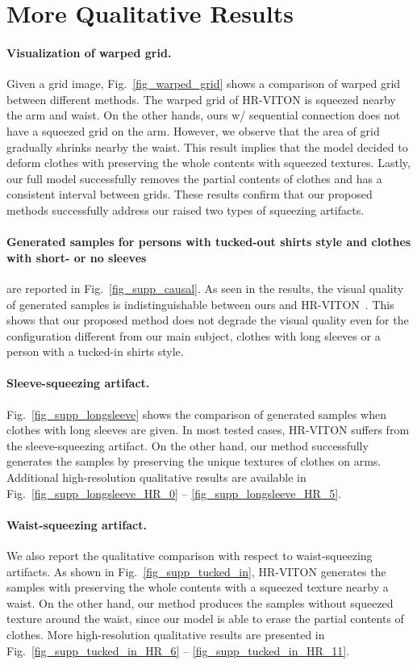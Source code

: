 \section{More Qualitative Results}


\paragraph{Visualization of warped grid.} 
Given a grid image, Fig.~\ref{fig_warped_grid} shows a comparison of warped grid between different methods.
The warped grid of HR-VITON is squeezed nearby the arm and waist.
On the other hands, ours w/ sequential connection does not have a squeezed grid on the arm.
However, we observe that the area of grid gradually shrinks nearby the waist.
This result implies that the model decided to deform clothes with preserving the whole contents with squeezed textures.
Lastly, our full model successfully removes the partial contents of clothes and has a consistent interval between grids.
These results confirm that our proposed methods successfully address our raised two types of squeezing artifacts.

\paragraph{Generated samples for persons with tucked-out shirts style and clothes with short- or no sleeves} are reported in Fig.~\ref{fig_supp_causal}.
As seen in the results, the visual quality of generated samples is indistinguishable between ours and HR-VITON~\cite{lee2022hrviton}.
This shows that our proposed method does not degrade the visual quality
even for the configuration different from our main subject, 
clothes with long sleeves or a person with a tucked-in shirts style.

\paragraph{Sleeve-squeezing artifact.}
Fig.~\ref{fig_supp_longsleeve} shows the comparison of generated samples when clothes with long sleeves are given.
In most tested cases, HR-VITON suffers from the sleeve-squeezing artifact.
On the other hand, our method successfully generates the samples by preserving the unique textures of clothes on arms.
Additional high-resolution qualitative results are available in Fig.~\ref{fig_supp_longsleeve_HR_0} -- \ref{fig_supp_longsleeve_HR_5}.


\paragraph{Waist-squeezing artifact.}
We also report the qualitative comparison with respect to waist-squeezing artifacts.
As shown in Fig.~\ref{fig_supp_tucked_in}, HR-VITON generates the samples with preserving the whole contents with a squeezed texture nearby a waist.
On the other hand, our method produces the samples without squeezed texture around the waist, since our model is able to erase the partial contents of clothes.
More high-resolution qualitative results are presented in Fig.~\ref{fig_supp_tucked_in_HR_6} -- \ref{fig_supp_tucked_in_HR_11}.


